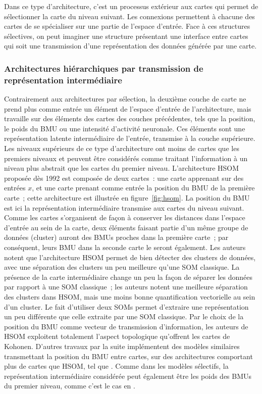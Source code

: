 \documentclass[../main]{subfiles}
\begin{document}
Dans ce type d'architecture, c'est un processus extérieur aux cartes qui permet de sélectionner la carte du niveau suivant. Les connexions permettent à chacune des cartes de se spécialiser sur une partie de l'espace d'entrée.
Face à ces structures sélectives, on peut imaginer une structure présentant une interface entre cartes qui soit une transmission d'une représentation des données générée par une carte.

\subsubsection{Architectures hiérarchiques par transmission de représentation intermédiaire}

Contrairement aux architectures par sélection, la deuxième couche de carte ne prend plus comme entrée un élément de l'espace d'entrée de l'architecture, mais travaille sur des éléments des cartes des couches précédentes, tels que la position, le poids du BMU ou une intensité d'activité neuronale. 
Ces éléments sont une représentation latente intermédiaire de l'entrée, transmise à la couche supérieure. Les niveaux supérieurs de ce type d'architecture ont moins de cartes que les premiers niveaux et peuvent être considérés comme traitant l'information à un niveau plus abstrait que les cartes du premier niveau.
L'architecture  HSOM \cite{lampinen_clustering_1992} proposée dès 1992 est composée de deux cartes~: une carte apprenant sur des entrées $x$, et une carte prenant comme entrée la position du BMU de la première carte~; cette architecture est illustrée en figure~\ref{fig:hsom}. La position du BMU est ici la représentation intermédiaire transmise aux cartes du niveau suivant.
Comme les cartes s'organisent de façon à conserver les distances dans l'espace d'entrée au sein de la carte, deux éléments faisant partie d'un même groupe de données (cluster) auront des BMUs proches dans la première carte~; par conséquent, leurs BMU dans la seconde carte le seront également. 
Les auteurs notent que l'architecture HSOM permet de bien détecter des clusters de données, avec une séparation des clusters un peu meilleure qu'une SOM classique. La présence de la carte intermédiaire change un peu la façon de séparer les données par rapport à une SOM classique~; les auteurs notent une meilleure séparation des clusters dans HSOM, mais une moins bonne quantification vectorielle au sein d'un cluster. Le fait d'utiliser deux SOMs permet d'extraire une représentation un peu différente que celle extraite par une SOM classique.
Par le choix de la position du BMU comme vecteur de transmission d'information, les auteurs de HSOM exploitent totalement l'aspect topologique qu'offrent les cartes de Kohonen. D'autres travaux par la suite implémentent des modèles similaires transmettant la position du BMU entre cartes, sur des architectures comportant plus de cartes que HSOM, tel que \cite{hagenauer_hierarchical_2013}.
Comme dans les modèles sélectifs, la représentation intermédiaire considérée peut également être les poids des BMUs du premier niveau, comme c'est le cas en \cite{wang_comparisonal_2007, gunes_kayacik_hierarchical_2007}.
\end{document}
